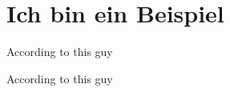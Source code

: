 \documentclass[12pt,oneside,paper=a4,ngerman]{scrartcl}
\begin{document}
\section{Ich bin ein Beispiel}

According to this guy \citet[1]{Knuth:1997:ACP:260999}
\begin{quote}
    \blindtext
\end{quote}
According to this guy \citep[1]{Knuth:1997:ACP:260999}
\begin{quote}
    \blindtext
\end{quote}
\clearpage
\printbibliography
\end{document}
